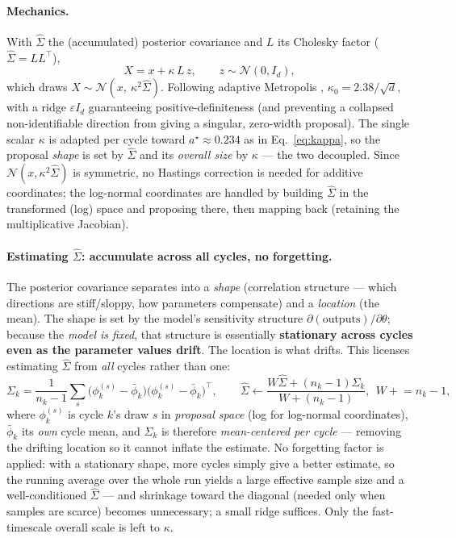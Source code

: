 \documentclass[11pt]{article}
\begin{document}
\paragraph{Mechanics.} With $\hat\Sigma$ the (accumulated) posterior
covariance and $L$ its Cholesky factor ($\hat\Sigma = LL^{\!\top}$),
\begin{equation}
  X = x + \kappa\,L\,z,\qquad z\sim\mathcal N(0,I_d),
  \label{eq:full}
\end{equation}
which draws $X\sim\mathcal N(x,\ \kappa^2\hat\Sigma)$. Following adaptive
Metropolis \cite{haario2001}, $\kappa_0 = 2.38/\sqrt d$, with a ridge
$\varepsilon I_d$ guaranteeing positive-definiteness (and preventing a
collapsed non-identifiable direction from giving a singular, zero-width
proposal). The single scalar $\kappa$ is adapted per cycle toward
$a^\star\approx0.234$ as in Eq.~\eqref{eq:kappa}, so the proposal
\emph{shape} is set by $\hat\Sigma$ and its \emph{overall size} by
$\kappa$ --- the two decoupled. Since $\mathcal N(x,\kappa^2\hat\Sigma)$ is
symmetric, no Hastings correction is needed for additive coordinates; the
log-normal coordinates are handled by building $\hat\Sigma$ in the
transformed (log) space and proposing there, then mapping back (retaining
the multiplicative Jacobian).

\paragraph{Estimating $\hat\Sigma$: accumulate across all cycles, no
forgetting.} The posterior covariance separates into a \emph{shape}
(correlation structure --- which directions are stiff/sloppy, how
parameters compensate) and a \emph{location} (the mean). The shape is set
by the model's sensitivity structure $\partial(\text{outputs})/\partial
\theta$; because the \emph{model is fixed}, that structure is essentially
\textbf{stationary across cycles even as the parameter values drift}. The
location is what drifts. This licenses estimating $\hat\Sigma$ from
\emph{all} cycles rather than one:
\begin{equation}
  \Sigma_k = \frac{1}{n_k-1}\sum_{s}\big(\phi_k^{(s)}-\bar\phi_k\big)
             \big(\phi_k^{(s)}-\bar\phi_k\big)^{\!\top},
  \qquad
  \hat\Sigma \leftarrow \frac{W\hat\Sigma + (n_k-1)\Sigma_k}{W+(n_k-1)},
  \ \ W \mathrel{+}= n_k-1,
  \label{eq:accum}
\end{equation}
where $\phi_k^{(s)}$ is cycle $k$'s draw $s$ in \emph{proposal space} (log
for log-normal coordinates), $\bar\phi_k$ its \emph{own} cycle mean, and
$\Sigma_k$ is therefore \emph{mean-centered per cycle} --- removing the
drifting location so it cannot inflate the estimate. No forgetting factor
is applied: with a stationary shape, more cycles simply give a better
estimate, so the running average over the whole run yields a large
effective sample size and a well-conditioned $\hat\Sigma$ --- and
shrinkage toward the diagonal (needed only when samples are scarce)
becomes unnecessary; a small ridge suffices. Only the fast-timescale
overall scale is left to $\kappa$.
\end{document}
